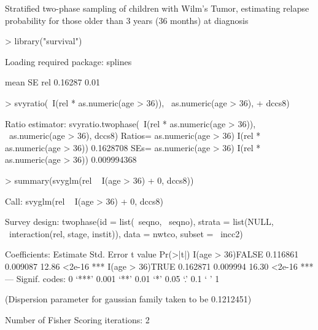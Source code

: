 \documentclass{article}
\begin{document}
Stratified two-phase sampling of children with Wilm's Tumor,
estimating relapse probability for those older than 3 years (36
months) at diagnosis
\begin{Schunk}
\begin{Sinput}
> library("survival")
\end{Sinput}
\begin{Soutput}
Loading required package: splines
\end{Soutput}
\begin{Soutput}
       mean   SE
rel 0.16287 0.01
\end{Soutput}
\begin{Sinput}
> svyratio(~I(rel * as.numeric(age > 36)), ~as.numeric(age > 36), 
+     dccs8)
\end{Sinput}
\begin{Soutput}
Ratio estimator: svyratio.twophase(~I(rel * as.numeric(age > 36)), ~as.numeric(age > 
    36), dccs8)
Ratios=
                              as.numeric(age > 36)
I(rel * as.numeric(age > 36))            0.1628708
SEs=
                              as.numeric(age > 36)
I(rel * as.numeric(age > 36))          0.009994368
\end{Soutput}
\begin{Sinput}
> summary(svyglm(rel ~ I(age > 36) + 0, dccs8))
\end{Sinput}
\begin{Soutput}
Call:
svyglm(rel ~ I(age > 36) + 0, dccs8)

Survey design:
twophase(id = list(~seqno, ~seqno), strata = list(NULL, ~interaction(rel, 
    stage, instit)), data = nwtco, subset = ~incc2)

Coefficients:
                 Estimate Std. Error t value Pr(>|t|)    
I(age > 36)FALSE 0.116861   0.009087   12.86   <2e-16 ***
I(age > 36)TRUE  0.162871   0.009994   16.30   <2e-16 ***
---
Signif. codes:  0 ‘***’ 0.001 ‘**’ 0.01 ‘*’ 0.05 ‘.’ 0.1 ‘ ’ 1 

(Dispersion parameter for gaussian family taken to be 0.1212451)

Number of Fisher Scoring iterations: 2
\end{Soutput}
\end{Schunk}
\end{document}
